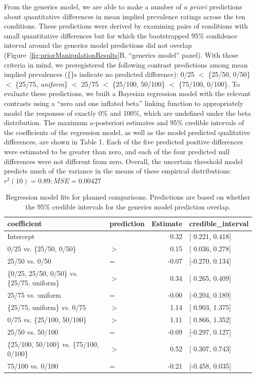 \documentclass[,man,floatsintext]{apa6}
\theoremstyle{definition}
\theoremstyle{definition}
\theoremstyle{definition}
\theoremstyle{remark}
\begin{document}
From the generics model, we are able to make a number of \emph{a priori}
predictions about quantitative differences in mean implied prevalence
ratings across the ten conditions. These predictions were derived by
examining pairs of conditions with small quantitative differences but
for which the bootstrapped 95\% confidence interval around the generics
model predictions did not overlap
(Figure~\ref{fig:priorManipulationResults}B, \enquote{generics model}
panel). With those criteria in mind, we preregistered the following
contrast predictions among mean implied prevalences (\{\}s indicate no
predicted difference): 0/25 \(<\) \{25/50, 0/50\} \(<\) \{25/75,
\emph{uniform}\} \(<\) 25/75 \(<\) \{25/100, 50/100\} \(<\) \{75/100,
0/100\}. To evaluate these predictions, we built a Bayesian regression
model with the relevant contrasts using a \enquote{zero and one inflated
beta} linking function to appropriately model the responses of exactly
0\% and 100\%, which are undefined under the beta distribution. The
maximum a-posteriori estimates and 95\% credible intervals of the
coefficients of the regression model, as well as the model predicted
qualitative differences, are shown in Table 1. Each of the five
predicted positive differences were estimated to be greater than zero,
and each of the four predicted null differences were not different from
zero. Overall, the uncertain threshold model predicts much of the
variance in the means of these empirical distributions:
\(r^2(10) = 0.89; MSE = 0.00427\)

\begin{table}[H]
\centering
\begingroup\fontsize{9pt}{10pt}\selectfont
\begin{tabular}{llrl}
  \hline
coefficient & prediction & Estimate & credible\_interval \\ 
  \hline
Intercept &  & 0.32 & [ 0.221, 0.418] \\ 
  0/25 vs. \{25/50, 0/50\} & $>$ & 0.15 & [ 0.036, 0.278] \\ 
  25/50 vs. 0/50 & = & -0.07 & [-0.270, 0.134] \\ 
  \{0/25, 25/50, 0/50\} vs. \{25/75, uniform\} & $>$ & 0.34 & [ 0.265, 0.409] \\ 
  25/75 vs. uniform & = & -0.00 & [-0.204, 0.189] \\ 
  \{25/75, uniform\} vs. 0/75 & $>$ & 1.14 & [ 0.903, 1.375] \\ 
  0/75 vs. \{25/100, 50/100\} & $>$ & 1.11 & [ 0.866, 1.352] \\ 
  25/50 vs. 50/100 & = & -0.09 & [-0.297, 0.127] \\ 
  \{25/100, 50/100\} vs. \{75/100, 0/100\} & $>$ & 0.52 & [ 0.307, 0.743] \\ 
  75/100 vs. 0/100 & = & -0.21 & [-0.458, 0.035] \\ 
   \hline
\end{tabular}
\endgroup
\caption{Regression model fits for planned comparisons. Predictions are based on whether the 95\% credible intervals for the generics model prediction overlap.} 
\end{table}
\end{document}

